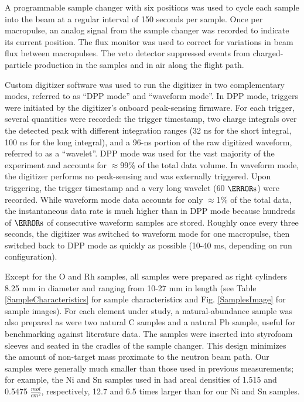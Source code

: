 \documentclass[twocolumn,secnumarabic,amssymb, nobibnotes, aps, prl,
superscriptaddress, nobalancelastpage, draft]{revtex4}
\begin{document}
A programmable sample changer with six positions
was used to cycle each sample into the beam at a regular interval of 150 seconds 
per sample. Once per macropulse, an analog signal from the sample changer
was recorded to indicate its current position.
The flux monitor was used to correct for variations in beam flux between 
macropulses. The veto detector suppressed events from charged-particle production 
in the samples and in air along the flight path.

Custom digitizer software was used to run the 
digitizer in two complementary modes, referred to as ``DPP mode'' and ``waveform 
mode''. In DPP mode, triggers were initiated by the digitizer's onboard
peak-sensing firmware. For each trigger, several quantities were recorded: the trigger 
timestamp, two charge integrals over the detected peak with different
integration ranges (32 ns for the short integral, 100 ns for the long integral),
and a 96-ns portion of the raw digitized waveform, referred to as a ``wavelet''.
DPP mode was used for the vast majority of the 
experiment and accounts for $\approx$99\% of the total data volume. In waveform mode, 
the digitizer performs no peak-sensing and was externally triggered. Upon 
triggering, the trigger timestamp and a very long wavelet (60 $\micro\second$) 
were recorded. While waveform mode data accounts for only $\approx$1\% of the total data, 
the instantaneous data rate is much higher than in DPP 
mode because hundreds of $\micro\second$ of consecutive waveform samples are 
stored. Roughly once every three seconds, the digitizer was switched to 
waveform mode for one macropulse, then switched back to DPP mode as quickly as
possible (10-40 ms, depending on run configuration).  

Except for the O and Rh samples, all samples were prepared as right
cylinders 8.25 mm in diameter and ranging from 10-27 mm in length (see
Table \ref{SampleCharacteristics} for sample characteristics and Fig. \ref{SamplesImage}
for sample images). For each element under study, a natural-abundance sample
was also prepared as were two natural C
samples and a natural Pb sample, useful for benchmarking against
literature data. The samples
were inserted into styrofoam sleeves and seated in the cradles of the sample
changer. This design minimizes the amount of non-target mass proximate to the
neutron beam path. Our samples were generally
much smaller than those used in previous measurements;
for example, the Ni and Sn samples used in \cite{Abfalterer2001,
Finlay1993} had areal densities of 1.515 and 0.5475
$\frac{mol}{cm^{2}}$, respectively, 12.7 and 6.5 times larger than for our
Ni and Sn samples. 
\end{document}
